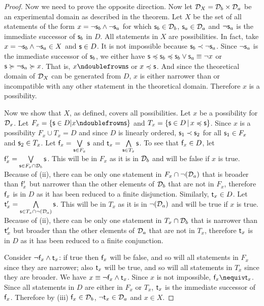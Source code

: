 \begin{mathSection}
\begin{proof}
		Now we need to prove the opposite direction. Now let $\edomain_X = \edomain_b \times \edomain_a$ be an experimental domain as described in the theorem. Let $X$ be the set of all statements of the form $x = \NOT \stmt_b \AND \NOT \stmt_a$ for which $\stmt_b \in \edomain_b$, $\stmt_a \in \edomain_a$ and $\NOT \stmt_a$ is the immediate successor of $\stmt_b$ in $D$. All statements in $X$ are possibilities. In fact, take $x = \NOT \stmt_b \AND \NOT \stmt_a \in X$ and $\stmt \in D$. It is not impossible because $\stmt_b \snarrower \NOT \stmt_a$. Since $\NOT \stmt_a$ is the immediate successor of $\stmt_b$, we either have $\stmt \narrower \stmt_b \narrower \stmt_b \OR \stmt_a \equiv \NOT x$ or $\stmt \broader \NOT \stmt_a \broader x$. That is, $x \ncomp \stmt$ or $x \narrower \stmt$. And since the theoretical domain of $\edomain_X$ can be generated from $D$, $x$ is either narrower than or incompatible with any other statement in the theoretical domain. Therefore $x$ is a possibility.
		
		Now we show that $X$, as defined, covers all possibilities. Let $x$ be a possibility for $\edomain_x$. Let $F_x=\{\stmt \in D| x \ncomp \stmt \}$ and $T_x=\{\stmt \in D \, | \, x \narrower \stmt \}$. Since $x$ is a possibility $F_x \cup T_x = D$ and since $D$ is linearly ordered, $\stmt_1 \snarrower \stmt_2$ for all $\stmt_1 \in F_x$ and $\stmt_2 \in T_x$. Let $\stmt[f]_x = \bigOR\limits_{\stmt \in F_x} \stmt$ and $\stmt[t]_x = \bigAND\limits_{\stmt \in T_x} \stmt$. To see that $\stmt[f]_x \in D$, let $\stmt[f]'_x = \bigOR\limits_{\stmt \in F_x\cap\edomain_b} \stmt$. This will be in $F_x$ as it is in $\edomain_b$ and will be false if $x$ is true. Because of (ii), there can be only one statement in $F_x \cap \NOT(\edomain_a)$ that is broader than $\stmt[f]'_x$ but narrower than the other elements of $\edomain_b$ that are not in $F_x$, therefore $\stmt[f]_x$ is in $D$ as it has been reduced to a finite disjunction. Similarly, $\stmt[t]_x \in D$. Let $\stmt[t]'_x = \bigAND\limits_{\stmt \in T_x\cap \NOT(\edomain_a)} \stmt$. This will be in $T_x$ as it is in $\NOT (\edomain_a)$ and will be true if $x$ is true. Because of (ii), there can be only one statement in $T_x \cap \edomain_b$ that is narrower than $\stmt[t]'_x$ but broader than the other elements of $\edomain_a$ that are not in $T_x$, therefore $\stmt[t]_x$ is in $D$ as it has been reduced to a finite conjunction.
		
		Consider $\NOT \stmt[f]_x \AND \stmt[t]_x$: if true then $\stmt[f]_x$ will be false, and so will all statements in $F_x$ since they are narrower; also $\stmt[t]_x$ will be true, and so will all statements in $T_x$ since they are broader. We have $x \equiv \NOT \stmt[f]_x \AND \stmt[t]_x$. Since $x$ is not impossible, $\stmt[f]_x \nequiv \stmt[t]_x$. Since all statements in $D$ are either in $F_x$ or $T_x$, $\stmt[t]_x$ is the immediate successor of $\stmt[f]_x$. Therefore by (iii) $\stmt[f]_x \in \edomain_b$,  $\NOT \stmt[t]_x \in \edomain_a$ and $x \in X$.
		

\end{proof}
\end{mathSection}
